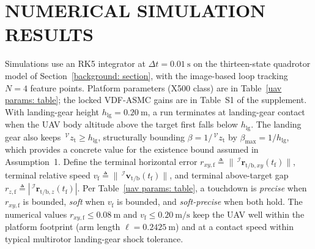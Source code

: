 
\section{NUMERICAL SIMULATION RESULTS}
\label{experimentation: section}
Simulations use an RK5 integrator at $\Delta t=0.01~\text{s}$ on the thirteen-state quadrotor model of Section~\ref{background: section}, with the image-based loop tracking $N=4$ feature points. Platform parameters (X500 class) are in Table~\ref{uav params: table}; the locked VDF-ASMC gains are in Table~S1 of the supplement. With landing-gear height $h_\text{lg}=0.20~\text{m}$, a run terminates at landing-gear contact when the UAV body altitude above the target first falls below $h_\text{lg}$. The landing gear also keeps $\,^\mathcal{V}z_\text{t}\ge h_\text{lg}$, structurally bounding $\beta=1/\,^\mathcal{V}z_\text{t}$ by $\beta_\text{max}=1/h_\text{lg}$, which provides a concrete value for the existence bound assumed in Assumption~1. Define the terminal horizontal error $r_{xy,\text{f}} \triangleq \|\,^\mathcal{I}\boldsymbol{r}_{\text{t/b},xy}(t_\text{f})\|$, terminal relative speed $v_\text{f} \triangleq \|\,^\mathcal{I}\boldsymbol{v}_{\text{t/b}}(t_\text{f})\|$, and terminal above-target gap $r_{z,\text{f}} \triangleq |\,^\mathcal{I}\boldsymbol{r}_{\text{t/b},z}(t_\text{f})|$. Per Table~\ref{uav params: table}, a touchdown is \emph{precise} when $r_{xy,\text{f}}$ is bounded, \emph{soft} when $v_\text{f}$ is bounded, and \emph{soft-precise} when both hold. The numerical values $r_{xy,\text{f}}\le 0.08~\text{m}$ and $v_\text{f}\le 0.20~\text{m/s}$ keep the UAV well within the platform footprint (arm length $\ell=0.2425~\text{m}$) and at a contact speed within typical multirotor landing-gear shock tolerance.

